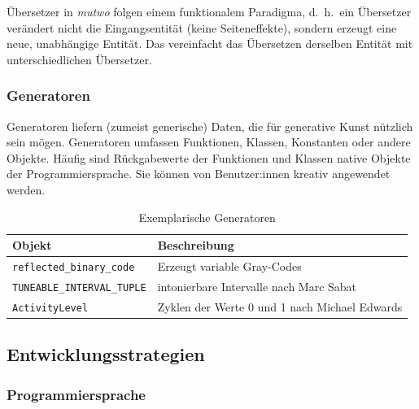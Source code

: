 \documentclass[12pt,a4paper,ngerman]{article}
\begin{document}
\smallskip


Übersetzer in \emph{mutwo} folgen einem funktionalem Paradigma, d.~h.\ ein Übersetzer verändert nicht die Eingangsentität (keine Seiteneffekte), sondern erzeugt eine neue, unabhängige Entität.
Das vereinfacht das Übersetzen derselben Entität mit unterschiedlichen Übersetzer.

\subsubsection{Generatoren}

Generatoren liefern (zumeist generische) Daten, die für generative Kunst nützlich sein mögen.
Generatoren umfassen Funktionen, Klassen, Konstanten oder andere Objekte.
Häufig sind Rückgabewerte der Funktionen und Klassen native Objekte der Programmiersprache.
Sie können von Benutzer:innen kreativ angewendet werden.

\begin{table}[h!]
    \begin{center}
        \begin{tabular}{l l} 
            \hline
            Objekt & Beschreibung \\ [0.5ex] 
            \hline\hline
            \texttt{reflected\_binary\_code} & Erzeugt variable Gray-Codes \\
            \texttt{TUNEABLE\_INTERVAL\_TUPLE} & intonierbare Intervalle nach Marc Sabat \\
            \texttt{ActivityLevel} & Zyklen der Werte 0 und 1 nach Michael Edwards \\ [1ex] 
            \hline
        \end{tabular}
    \end{center}

    \caption{Exemplarische Generatoren}
\end{table}


\subsection{Entwicklungsstrategien}

\subsubsection{Programmiersprache}
\label{programmingLanguage}
\end{document}
